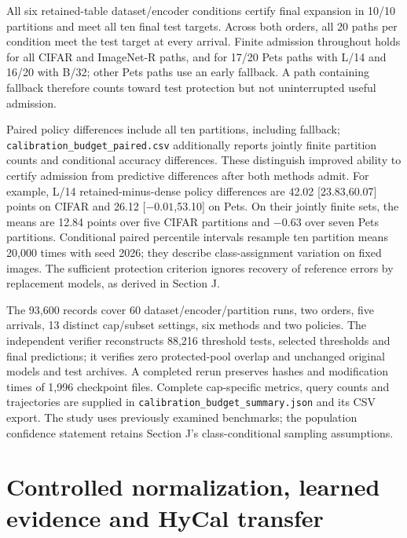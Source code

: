 \documentclass[preprint,review,12pt]{elsarticle}
\begin{document}
All six retained-table dataset/encoder conditions certify final expansion in 10/10 partitions and meet all ten final test targets. Across both orders, all 20 paths per condition meet the test target at every arrival. Finite admission throughout holds for all CIFAR and ImageNet-R paths, and for 17/20 Pets paths with L/14 and 16/20 with B/32; other Pets paths use an early fallback. A path containing fallback therefore counts toward test protection but not uninterrupted useful admission.

Paired policy differences include all ten partitions, including fallback; \nolinkurl{calibration_budget_paired.csv} additionally reports jointly finite partition counts and conditional accuracy differences. These distinguish improved ability to certify admission from predictive differences after both methods admit. For example, L/14 retained-minus-dense policy differences are 42.02 [23.83,60.07] points on CIFAR and 26.12 [$-0.01$,53.10] on Pets. On their jointly finite sets, the means are 12.84 points over five CIFAR partitions and $-0.63$ over seven Pets partitions. Conditional paired percentile intervals resample ten partition means 20,000 times with seed 2026; they describe class-assignment variation on fixed images. The sufficient protection criterion ignores recovery of reference errors by replacement models, as derived in Section J.

The 93,600 records cover 60 dataset/encoder/partition runs, two orders, five arrivals, 13 distinct cap/subset settings, six methods and two policies. The independent verifier reconstructs 88,216 threshold tests, selected thresholds and final predictions; it verifies zero protected-pool overlap and unchanged original models and test archives. A completed rerun preserves hashes and modification times of 1,996 checkpoint files. Complete cap-specific metrics, query counts and trajectories are supplied in \nolinkurl{calibration_budget_summary.json} and its CSV export. The study uses previously examined benchmarks; the population confidence statement retains Section J's class-conditional sampling assumptions.


\FloatBarrier
\section{Controlled normalization, learned evidence and HyCal transfer}
\label{app:normalizationrevision}
\end{document}
